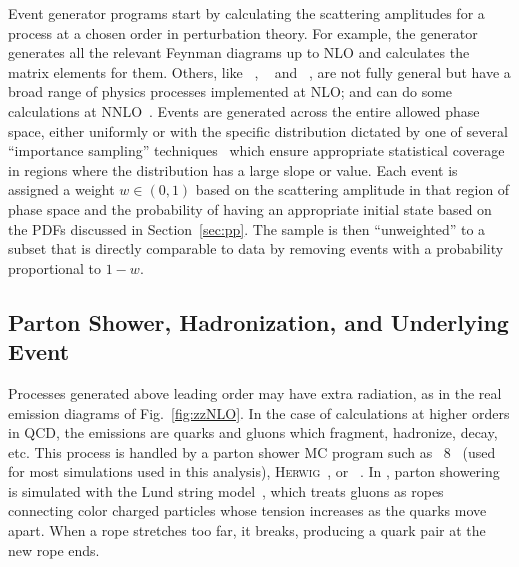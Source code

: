 Event generator programs start by calculating the scattering amplitudes for a process at a chosen order in perturbation theory.
For example, the generator {\MGAMC}~\cite{Alwall:2014hca} generates all the relevant Feynman diagrams up to NLO and calculates the matrix elements for them.
Others, like {\POWHEG}~\cite{Nason:2004rx,Frixione:2007vw,Alioli:2010xd}, {\SHERPA}~\cite{Gleisberg:2008ta} and {\MCFM}~\cite{Campbell:1999ah,Campbell:2011bn,Campbell:2015qma}, are not fully general but have a broad range of physics processes implemented at NLO\@; {\SHERPA} and {\MCFM} can do some calculations at NNLO~\cite{Boughezal:2016wmq}.
Events are generated across the entire allowed phase space, either uniformly or with the specific distribution dictated by one of several ``importance sampling'' techniques~\cite{Lepage:1977sw,Olive:2016xmw} which ensure appropriate statistical coverage in regions where the distribution has a large slope or value.
Each event is assigned a weight $w \in (0,1)$ based on the scattering amplitude in that region of phase space and the probability of having an appropriate initial state based on the PDFs discussed in Section~\ref{sec:pp}.
The sample is then ``unweighted'' to a subset that is directly comparable to data by removing events with a probability proportional to $1 - w$.


\subsection{Parton Shower, Hadronization, and Underlying Event}\label{sec:partonShower}

Processes generated above leading order may have extra radiation, as in the real emission diagrams of Fig.~\ref{fig:zzNLO}.
In the case of calculations at higher orders in QCD, the emissions are quarks and gluons which fragment, hadronize, decay, etc.
This process is handled by a parton shower MC program such as {\PYTHIA}~8~\cite{Sjostrand:2014zea} (used for most simulations used in this analysis), \textsc{Herwig}~\cite{Bahr:2008pv,Bellm:2015jjp}, or {\SHERPA}~\cite{Gleisberg:2008ta}.
In {\PYTHIA}, parton showering is simulated with the Lund string model~\cite{Andersson:1978vj,Andersson:1983jt,Andersson:2001yu}, which treats gluons as ropes connecting color charged particles whose tension increases as the quarks move apart.
When a rope stretches too far, it breaks, producing a quark pair at the new rope ends.

